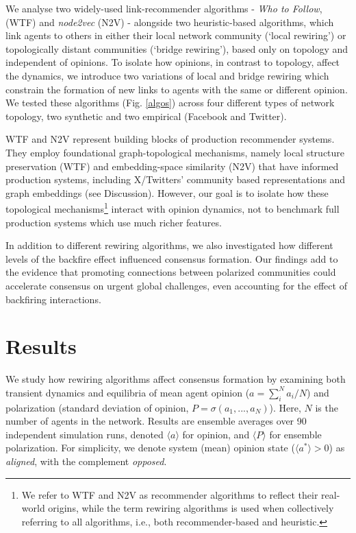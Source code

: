 \documentclass[unnumsec,webpdf,contemporary,large]{oup-authoring-template}%
\theoremstyle{thmstyleone}%
\theoremstyle{thmstyletwo}%
\theoremstyle{thmstylethree}%
\begin{document}
We analyse two widely-used \cite{espin-noboa_inequality_2022} link-recommender algorithms - \textit{Who to Follow}, (WTF) and \textit{node2vec} (N2V) - alongside two heuristic-based algorithms, which link agents to others in either their local network community (`local rewiring') or topologically distant communities (`bridge rewiring'), based only on topology and independent of opinions. To isolate how opinions, in contrast to topology, affect the dynamics, we introduce two variations of local and bridge rewiring which constrain the formation of new links to agents with the same or different opinion. We tested these algorithms (Fig. \ref{algos}) across four different types of network topology, two synthetic and two empirical (Facebook and Twitter).

WTF and N2V represent building blocks of production recommender systems. They employ foundational graph-topological mechanisms, namely local structure preservation (WTF) and embedding-space similarity (N2V) that have informed production systems, including X/Twitters' community based representations and graph embeddings (see Discussion). However, our goal is to isolate how these topological mechanisms\footnote{ We refer to WTF and N2V as recommender algorithms  to reflect their real-world origins, while the term rewiring algorithms is used when collectively referring to all algorithms, i.e., both recommender-based and heuristic.} interact with opinion dynamics, not to benchmark full production systems which use much richer features.

In addition to different rewiring algorithms, we also investigated how different levels of the backfire effect influenced consensus formation. Our findings add to the evidence that promoting connections between polarized communities could accelerate consensus on urgent global challenges, even accounting for the effect of backfiring interactions.


\section{Results}\label{sec:results}

We study how rewiring algorithms affect consensus formation by examining both transient dynamics and equilibria of mean agent opinion ($a = \sum_{i}^{N}a_i/N$) and polarization (standard deviation of opinion, $P = \sigma(a_1, ..., a_N)$). Here, $N$ is the number of agents in the network. Results are ensemble averages over 90 independent simulation runs, denoted $\langle a \rangle$ for opinion, and $\langle P \rangle$ for ensemble polarization. For simplicity, we denote system (mean) opinion state ($\langle a^* \rangle > 0$) as \textit{aligned}, with the complement \textit{opposed}.
\end{document}

